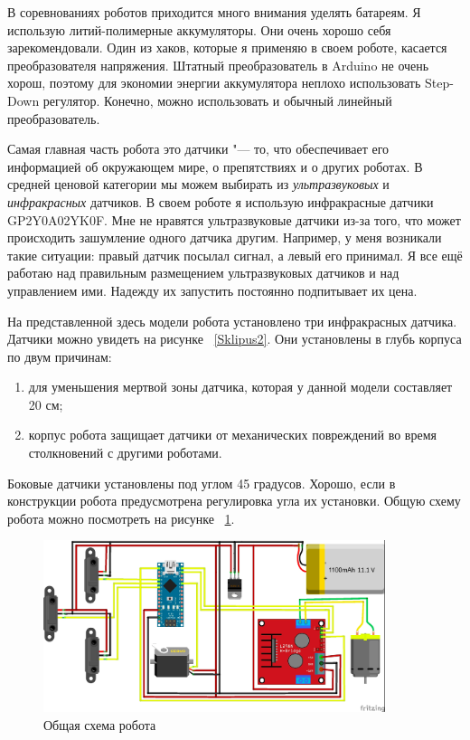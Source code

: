 \documentclass[10pt, a5paper]{article}
\begin{document}
В соревнованиях роботов приходится много внимания уделять батареям. Я использую литий-полимерные аккумуляторы. Они \linebreak очень хорошо себя зарекомендовали. Один из хаков, которые я применяю в своем роботе, касается преобразователя напряжения. Штатный преобразователь в Arduino не очень хорош, поэтому для экономии энергии аккумулятора неплохо использовать Step-Down регулятор\footnotemark[2]. Конечно, можно использовать и обычный линейный преобразователь.

Самая главная часть робота это датчики "--- то, что обеспечивает его информацией об окружающем мире, о препятствиях и о других роботах. В средней ценовой категории мы можем выбирать из \emph{ультразвуковых} и \emph{инфракрасных} датчиков. В своем роботе я использую инфракрасные датчики GP2Y0A02YK0F. Мне не нравятся ультразвуковые датчики из-за того, что может происходить зашумление одного датчика другим. Например, у меня возникали такие ситуации: правый датчик посылал сигнал, а левый его принимал. Я все ещё работаю над правильным размещением ультразвуковых датчиков и над управлением ими. Надежду их запустить постоянно подпитывает их цена.

На представленной здесь модели робота установлено три инфракрасных датчика. Датчики можно увидеть на рисунке ~\ref{Sklipus2}. Они установлены в глубь корпуса по двум причинам:

\begin{enumerate}
  \item для уменьшения мертвой зоны датчика, которая у данной модели составляет 20 см;
  \item корпус робота защищает датчики от механических повреждений во время столкновений с другими роботами.
\end{enumerate}

Боковые датчики установлены под углом 45 градусов. Хорошо, если в конструкции робота предусмотрена регулировка угла их установки.
Общую схему робота можно посмотреть на рисунке ~\ref{Sklipus5}.

\begin{figure}[h!]
  \centering
  \includegraphics[width=10cm]{w_09_2016_Sklipus5.png}
  \caption {Общая схема робота}\label{Sklipus5}
\end{figure} 
\end{document}
